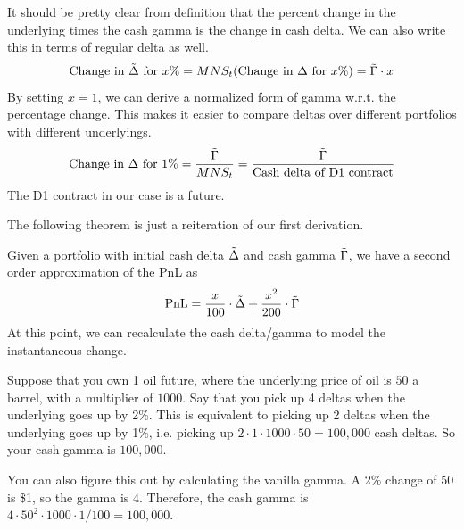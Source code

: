 \documentclass{article}
\begin{document}
    \begin{theorem}
      It should be pretty clear from definition that the percent change in the underlying times the cash gamma is the change in cash delta. We can also write this in terms of regular delta as well. 
      \begin{equation}
        \text{Change in } \Tilde{\Delta} \text{ for } x\% = M N S_t (\text{Change in } \Delta \text{ for } x\%) = \Tilde{\Gamma} \cdot x
      \end{equation}
      By setting $x = 1$, we can derive a normalized form of gamma w.r.t. the percentage change. This makes it easier to compare deltas over different portfolios with different underlyings. 
      \begin{equation}
        \text{Change in } \Delta \text{ for } 1\% = \frac{\Tilde{\Gamma}}{M N S_t} = \frac{\Tilde{\Gamma}}{\text{Cash delta of D1 contract}}
      \end{equation}
      The D1 contract in our case is a future. 
    \end{theorem}

    The following theorem is just a reiteration of our first derivation. 

    \begin{theorem}
      Given a portfolio with initial cash delta $\Tilde{\Delta}$ and cash gamma $\Tilde{\Gamma}$, we have a second order approximation of the PnL as
      \begin{equation}
        \mathrm{PnL} = \frac{x}{100} \cdot \Tilde{\Delta} + \frac{x^2}{200} \cdot \Tilde{\Gamma}
      \end{equation}
      At this point, we can recalculate the cash delta/gamma to model the instantaneous change.
    \end{theorem}

    \begin{example}
      Suppose that you own 1 oil future, where the underlying price of oil is $50$ a barrel, with a multiplier of $1000$. Say that you pick up 4 deltas when the underlying goes up by 2\%. This is equivalent to picking up 2 deltas when the underlying goes up by 1\%, i.e. picking up $2 \cdot 1 \cdot 1000 \cdot 50 = 100,000$ cash deltas. So your cash gamma is $100,000$. 

      You can also figure this out by calculating the vanilla gamma. A 2\% change of $50$ is \$1, so the gamma is $4$. Therefore, the cash gamma is $4 \cdot 50^2 \cdot 1000 \cdot 1 / 100 = 100,000$. 
    \end{example}
\end{document}
